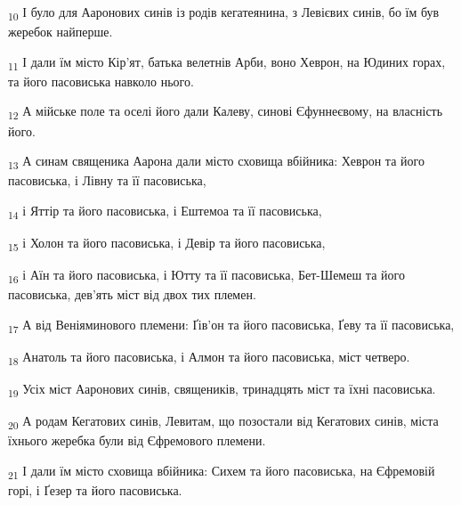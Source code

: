 \begin{tcolorbox}
\textsubscript{10} І було для Ааронових синів із родів кегатеянина, з Левієвих синів, бо їм був жеребок найперше.
\end{tcolorbox}
\begin{tcolorbox}
\textsubscript{11} І дали їм місто Кір'ят, батька велетнів Арби, воно Хеврон, на Юдиних горах, та його пасовиська навколо нього.
\end{tcolorbox}
\begin{tcolorbox}
\textsubscript{12} А мійське поле та оселі його дали Калеву, синові Єфуннеєвому, на власність його.
\end{tcolorbox}
\begin{tcolorbox}
\textsubscript{13} А синам священика Аарона дали місто сховища вбійника: Хеврон та його пасовиська, і Лівну та її пасовиська,
\end{tcolorbox}
\begin{tcolorbox}
\textsubscript{14} і Яттір та його пасовиська, і Ештемоа та її пасовиська,
\end{tcolorbox}
\begin{tcolorbox}
\textsubscript{15} і Холон та його пасовиська, і Девір та його пасовиська,
\end{tcolorbox}
\begin{tcolorbox}
\textsubscript{16} і Аїн та його пасовиська, і Ютту та її пасовиська, Бет-Шемеш та його пасовиська, дев'ять міст від двох тих племен.
\end{tcolorbox}
\begin{tcolorbox}
\textsubscript{17} А від Веніяминового племени: Ґів'он та його пасовиська, Ґеву та її пасовиська,
\end{tcolorbox}
\begin{tcolorbox}
\textsubscript{18} Анатоль та його пасовиська, і Алмон та його пасовиська, міст четверо.
\end{tcolorbox}
\begin{tcolorbox}
\textsubscript{19} Усіх міст Ааронових синів, священиків, тринадцять міст та їхні пасовиська.
\end{tcolorbox}
\begin{tcolorbox}
\textsubscript{20} А родам Кегатових синів, Левитам, що позостали від Кегатових синів, міста їхнього жеребка були від Єфремового племени.
\end{tcolorbox}
\begin{tcolorbox}
\textsubscript{21} І дали їм місто сховища вбійника: Сихем та його пасовиська, на Єфремовій горі, і Ґезер та його пасовиська.
\end{tcolorbox}
